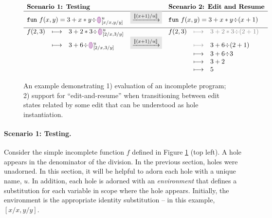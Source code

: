 \begin{figure}[ht]
\center
\ensuremath{
\begin{array}{rclcrcl}
\multicolumn{3}{l}{\textbf{\ScenerioOne: Testing}}
&
&
\multicolumn{3}{l}{\textbf{\ScenerioTwo: Edit and Resume}}
\\
\hline
\multicolumn{3}{l}{\texttt{fun}~f(x,y) = 3 + x * y {\div} \hehole{}^\metavar_{[x/x,y/y]}}
&
\multicolumn{1}{l}{
\colorbox{dVeryFaint}{$\xrightarrow{[\!| (x+1) / u |\!]}$}
}
&
\multicolumn{3}{l}{\texttt{fun}~f(x,y) = 3 + x * y {\div} (x+1)}
\\[2mm]
\hline
f(2,3) &\longmapsto & 3 + 2 * 3 {\div} \hehole{}^\metavar_{[2/x, 3/y]}
&
&
f(2,3) &{\color{gray} \longmapsto} & {\color{gray} 3 + 2 * 3 {\div} (2+1)}
\\
&\longmapsto& 3 + 6 {\div} \hehole{}^\metavar_{[2/x, 3/y]}
&
\multicolumn{1}{l}{
\colorbox{dVeryFaint}{$\xrightarrow{[\!| (x+1) / u |\!]}$}
}
&& {\color{gray} \longmapsto} & 3 + 6 {\div} (2 + 1)
\\
&&
&&& \longmapsto& 3 + 6 {\div} 3
\\
&&
&&& \longmapsto& 3 + 2
\\
&&
&&& \longmapsto& 5
\end{array}
}
\caption{An example demonstrating 1) evaluation of an incomplete program; 2) support for ``edit-and-resume'' when transitioning between edit states related by some edit that can be understood as hole instantiation.}
\label{fig:dynamics}
\end{figure}

\paragraph{Scenario 1: Testing.} Consider the simple incomplete function $f$ defined in Figure \ref{fig:dynamics} (top left).  
%
A hole appears in the denominator of the division. In the previous section,
holes were unadorned. In this section, it will be helpful to adorn each hole with a unique name, $u$. In addition, each hole is adorned with an \emph{environment} that defines a substitution for each variable in scope
where the hole appears. Initially, the environment is the appropriate identity substitution -- in this example, $[x/x, y/y]$. 

